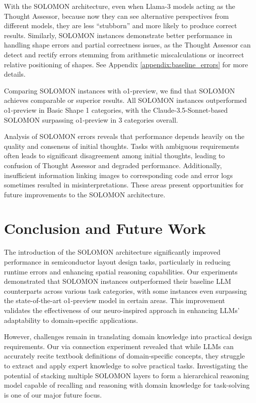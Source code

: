 \documentclass{article}
\begin{document}
With the SOLOMON architecture, even when Llama-3 models acting as the Thought Assessor, because now they can see alternative perspectives from different models, they are less ``stubborn'' and more likely to produce correct results. Similarly, SOLOMON instances demonstrate better performance in handling shape errors and partial correctness issues, as the Thought Assessor can detect and rectify errors stemming from arithmetic miscalculations or incorrect relative positioning of shapes. See Appendix \ref{appendix:baseline_errors} for more details.  

Comparing SOLOMON instances with o1-preview, we find that SOLOMON achieves comparable or superior results. All SOLOMON instances outperformed o1-preview in Basic Shape 1 categories, with the Claude-3.5-Sonnet-based SOLOMON surpassing o1-preview in 3 categories overall.

Analysis of SOLOMON errors reveals that performance depends heavily on the quality and consensus of initial thoughts. Tasks with ambiguous requirements often leads to significant disagreement among initial thoughts, leading to confusion of Thought Assessor and degraded performance. Additionally, insufficient information linking images to corresponding code and error logs sometimes resulted in misinterpretations. These areas present opportunities for future improvements to the SOLOMON architecture.

\section{Conclusion and Future Work}
The introduction of the SOLOMON architecture significantly improved performance in semiconductor layout design tasks, particularly in reducing runtime errors and enhancing spatial reasoning capabilities. Our experiments demonstrated that SOLOMON instances outperformed their baseline LLM counterparts across various task categories, with some instances even surpassing the state-of-the-art o1-preview model in certain areas. This improvement validates the effectiveness of our neuro-inspired approach in enhancing LLMs' adaptability to domain-specific applications.

However, challenges remain in translating domain knowledge into practical design requirements. Our via connection experiment revealed that while LLMs can accurately recite textbook definitions of domain-specific concepts, they struggle to extract and apply expert knowledge to solve practical tasks. Investigating the potential of stacking multiple SOLOMON layers to form a hierarchical reasoning model capable of recalling and reasoning with domain knowledge for task-solving is one of our major future focus.
\end{document}
